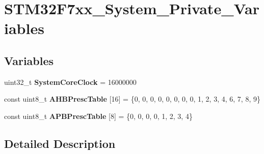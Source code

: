 \hypertarget{group___s_t_m32_f7xx___system___private___variables}{}\section{S\+T\+M32\+F7xx\+\_\+\+System\+\_\+\+Private\+\_\+\+Variables}
\label{group___s_t_m32_f7xx___system___private___variables}
\subsection*{Variables}
\begin{DoxyCompactItemize}
\item 
\mbox{\label{group___s_t_m32_f7xx___system___private___variables_gaa3cd3e43291e81e795d642b79b6088e6}} 
uint32\+\_\+t {\bfseries System\+Core\+Clock} = 16000000
\item 
\mbox{\label{group___s_t_m32_f7xx___system___private___variables_ga6e1d9cd666f0eacbfde31e9932a93466}} 
const uint8\+\_\+t {\bfseries A\+H\+B\+Presc\+Table} \mbox{[}16\mbox{]} = \{0, 0, 0, 0, 0, 0, 0, 0, 1, 2, 3, 4, 6, 7, 8, 9\}
\item 
\mbox{\label{group___s_t_m32_f7xx___system___private___variables_ga5b4f8b768465842cf854a8f993b375e9}} 
const uint8\+\_\+t {\bfseries A\+P\+B\+Presc\+Table} \mbox{[}8\mbox{]} = \{0, 0, 0, 0, 1, 2, 3, 4\}
\end{DoxyCompactItemize}


\subsection{Detailed Description}
